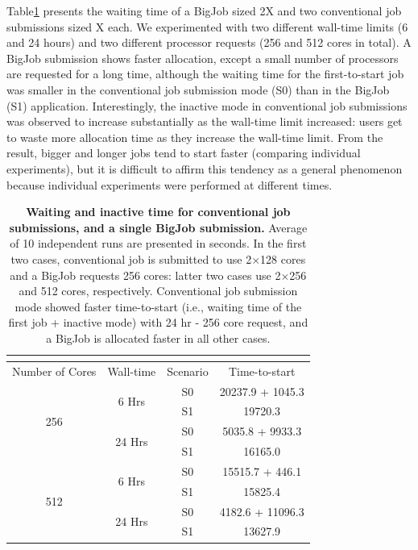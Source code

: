 \documentclass[preprint,12pt]{elsarticle}
\begin{document}
Table\ref{table:BJwaiting}  presents the waiting time of a BigJob sized 2X and two conventional job submissions sized X each. We experimented with two different wall-time limits (6 and 24 hours) and two different processor requests (256 and 512 cores in total). A BigJob submission shows faster allocation, except a small number of processors are requested for a long time, although the waiting time for the first-to-start job was smaller in the conventional job submission mode (S0) than in the BigJob (S1) application. Interestingly, the inactive mode in conventional job submissions was observed to increase substantially as the wall-time limit increased: users get to waste more allocation time as they increase the wall-time limit. From the result, bigger and longer jobs tend to start faster (comparing individual experiments), but it is difficult to affirm this tendency as a general phenomenon because individual experiments were performed at different times.


\begin{table}
  \caption{\small {\bf Waiting and inactive time for conventional job submissions, and a single BigJob submission.} Average of 10 independent runs are presented in seconds. In the first two cases, conventional job is submitted to use 2$\times$128 cores and a BigJob requests 256 cores: latter two cases use 2$\times$256 and 512 cores, respectively. Conventional job submission mode showed faster time-to-start (i.e., waiting time of the first job + inactive mode) with 24 hr - 256 core request, and a BigJob is allocated faster in all other cases.}
\label{table:BJwaiting}
\centering\footnotesize
 \begin{tabular}{c | c | c | c }
 \multicolumn{4}{c}{\phantom{\tiny 100}}\\
\hline
Number of Cores & Wall-time & Scenario & Time-to-start\\
\hline
\hline
\multirow{4}{0.1\textwidth}{256} & \multirow{2}{0.1\textwidth}{6 Hrs} & S0 & 20237.9 + 1045.3\\
\cline{3-4}
&  & S1 & 19720.3\\
\cline{2-4}
& \multirow{2}{0.1\textwidth}{24 Hrs} & S0 & 5035.8 + 9933.3\\
\cline{3-4}
&  & S1 & 16165.0\\
\hline
 \multirow{4}{0.1\textwidth}{512}& \multirow{2}{0.1\textwidth}{6 Hrs} & S0 & 15515.7 + 446.1\\
\cline{3-4}
&  & S1 & 15825.4\\
\cline{2-4}
& \multirow{2}{0.1\textwidth}{24 Hrs} & S0 & 4182.6 + 11096.3\\
\cline{3-4}
&  & S1 & 13627.9\\
\hline
\end{tabular}
\vspace{-1em}
\end{table}
\end{document}
